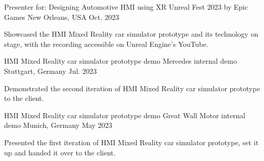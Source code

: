 

\begin{cventries}

  \cventry
    {Presenter for: Designing Automotive HMI using XR} %
    {Unreal Fest 2023 by Epic Games} %
    {New Orleans, USA} %
    {Oct. 2023} %
    {
      \begin{cvitems} %
        Showcased the HMI Mixed Reality car simulator prototype and its technology on stage, with the recording accessible on Unreal Engine's YouTube.
      \end{cvitems}
    }

  \cventry
    {HMI Mixed Reality car simulator prototype demo} %
    {Mercedes internal demo} %
    {Stuttgart, Germany} %
    {Jul. 2023} %
    {
      \begin{cvitems} %
        Demonstrated the second iteration of HMI Mixed Reality car simulator prototype to the client.
      \end{cvitems}
    }

  \cventry
    {HMI Mixed Reality car simulator prototype demo} %
    {Great Wall Motor internal demo} %
    {Munich, Germany} %
    {May 2023} %
    {
      \begin{cvitems} %
        Presented the first iteration of HMI Mixed Reality car simulator prototype, set it up and handed it over to the client.
      \end{cvitems}
    }

\end{cventries}
